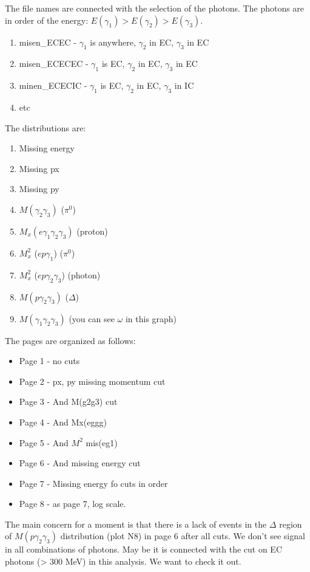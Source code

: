 \documentclass[11pt]{paper}
\begin{document}
The file names are connected with the selection of the photons.
The photons are in order of the energy: $E(\gamma_1)>E(\gamma_2)>E(\gamma_3)$.
\begin{enumerate}
\item misen\_ECEC       - $\gamma_1$ is anywhere,  $\gamma_2$ in EC, $\gamma_3$ in EC
\item misen\_ECECEC  -  $\gamma_1$ is EC,  $\gamma_2$ in EC, $\gamma_3$ in EC
\item minen\_ECECIC   -  $\gamma_1$ is EC,  $\gamma_2$ in EC, $\gamma_3$ in IC
\item etc
\end{enumerate}

The distributions are:
\begin{enumerate}
\item Missing energy
\item Missing px
\item Missing py
\item $M(\gamma_2 \gamma_3)$   ($\pi^0$)
\item $M_x(e\gamma_1\gamma_2\gamma_3)$  (proton)
\item $M^2_x$ ($ep\gamma_1$)  ($\pi^0$)
\item $M^2_x$ ($ep\gamma_2\gamma_3$) (photon)
\item $M(p\gamma_2\gamma_3)$ ($\Delta$)
\item $M(\gamma_1\gamma_2\gamma_3)$ (you can see $\omega$ in this graph)
\end{enumerate}

The pages are organized as follows:
\begin{itemize}
\item {Page 1} - no cuts
\item Page 2 - px, py missing momentum cut
\item Page 3 - And M(g2g3) cut
\item Page 4 - And Mx(eggg) 
\item Page 5 - And $M^2$ mis(eg1)
\item Page 6 - And missing energy cut
\item Page 7 - Missing energy fo cuts in order
\item Page 8 - as page 7, log scale.
\end{itemize}

The main concern for a moment is that there is a lack of events in the  $\Delta$ region  
of $M(p\gamma_2\gamma_3)$ distribution (plot N8)
in page 6 after all cuts. We don't see signal in all combinations of photons.
May be it is connected with the cut on EC photons (> 300 MeV) in this analysis. 
We want to check it out.

 
\end{document}
